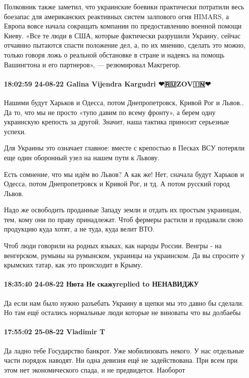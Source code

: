 Полковник также заметил, что украинские боевики практически потратили весь
боезапас для американских реактивных систем залпового огня HIMARS, а Европа
вовсе начала сокращать компании по предоставлению военной помощи Киеву. «Все те
люди в США, которые фактически разрушили Украину, сейчас отчаянно пытаются
спасти положение дел, а, по их мнению, сделать это можно, только говоря ложь о
реальной обстановке в стране и надеясь на помощь Вашингтона и его партнеров», —
резюмировал Макгрегор.

\paragraph{18:02:59 24-08-22 Galina Vijendra Kargudri ❤🇷🇺ZOV🇮🇳❤}

Нашими будут Харьков и Одесса, потом Днепропетровск, Кривой Рог и Львов.. Да то, что мы не просто «тупо давим по всему фронту», а берем одну украинскую крепость за другой. Значит, наша тактика приносит серьезные успехи.

Для Украины это означает главное: вместе с крепостью в Песках ВСУ потеряли еще один оборонный узел на нашем пути к Львову.

Есть сомнение, что мы идём во Львов? А как же!
Нет, сначала будут Харьков и Одесса, потом Днепропетровск и Кривой Рог, и тд. А потом русский город Львов.

Надо же освободить проданные Западу земли и отдать их простым украинцам, тем, кому они по праву принадлежат. Чтоб фермеры растили и продавали свою продукцию куда хотят, а не туда, куда велит ВТО.

Чтоб люди говорили на родных языках, как народы России. Венгры - на венгерском, румыны на румынском, украинцы на украинском. Да вы спросите у крымских татар, как это происходит в Крыму.

\paragraph{18:35:40 24-08-22 Нюта Не скажуreplied to НЕНАВИДЖУ}

Да если нам было нужно разъебать Украину в щепки мы это давно бы сделали. Но
там ещё остались нормальные люди которые не виноваты что вы долбаебы

\paragraph{17:55:02 25-08-22 Vladimir T}

Да ладно тебе
Государство банкрот.
Уже мобилизовать некого. У нас отдельные части порядок наводят. Ни одна девизия ещё не задействована.
При всем при этом нет экономического спада, и не предвидется. Наоборот


